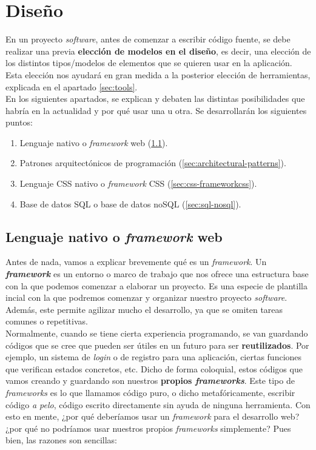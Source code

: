 \chapter{Diseño} \label{ch:design}
En un proyecto \textit{software}, antes de comenzar a escribir código fuente, se debe
realizar una previa \textbf{elección de modelos en el diseño}, es decir, una elección de
los distintos tipos/modelos de elementos que se quieren usar en la aplicación. Esta elección
nos ayudará en gran medida a la posterior elección de herramientas, explicada en el apartado
\ref{sec:tools}.\\

En los siguientes apartados, se explican y debaten las distintas posibilidades que habría en
la actualidad y por qué usar una u otra. Se desarrollarán los siguientes puntos:

    \begin{enumerate}
        \item Lenguaje nativo o \textit{framework} web (\ref{sec:language-webframework}).
        \item Patrones arquitectónicos de programación (\ref{sec:architectural-patterns}).
        \item Lenguaje CSS nativo o \textit{framework} CSS (\ref{sec:css-frameworkcss}).
        \item Base de datos SQL o base de datos noSQL (\ref{sec:sql-nosql}).
    \end{enumerate}

\section{Lenguaje nativo o \textit{framework} web} \label{sec:language-webframework}
Antes de nada, vamos a explicar brevemente qué es un \textit{framework}. Un
\textbf{\textit{framework}} es un entorno o marco de trabajo que nos ofrece una estructura
base con la que podemos comenzar a elaborar un proyecto. Es una especie de plantilla incial
con la que podremos comenzar y organizar nuestro proyecto \textit{software}. Además, este
permite agilizar mucho el desarrollo, ya que se omiten tareas comunes o repetitivas.\\

Normalmente, cuando se tiene cierta experiencia programando, se van guardando códigos que
se cree que pueden ser útiles en un futuro para ser \textbf{reutilizados}. Por ejemplo, un
sistema de \textit{login} o de registro para una aplicación, ciertas funciones que verifican
estados concretos, etc. Dicho de forma coloquial, estos códigos que vamos creando y
guardando son nuestros \textbf{propios \textit{frameworks}}. Este tipo de \textit{frameworks}
es lo que llamamos código puro, o dicho metafóricamente, escribir código \textit{a pelo},
código escrito directamente sin ayuda de ninguna herramienta. Con esto en mente, ¿por qué
deberíamos usar un \textit{framework} para el desarrollo web? ¿por qué no podríamos usar
nuestros propios \textit{frameworks} simplemente? Pues bien, las razones son sencillas:

